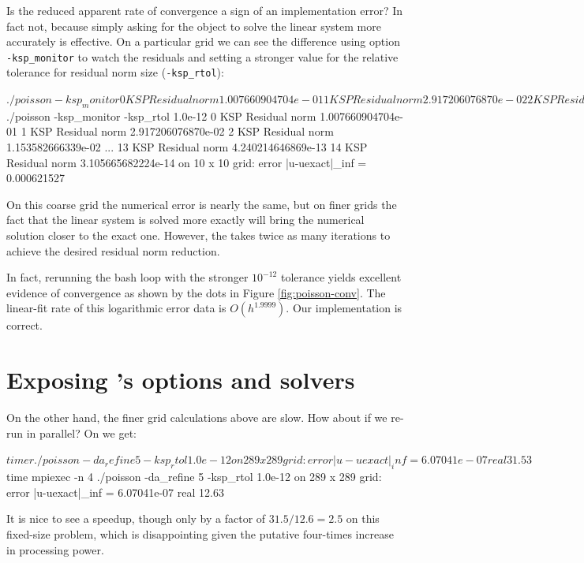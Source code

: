 Is the reduced apparent rate of convergence a sign of an implementation error?  In fact not, because simply asking for the \pKSP object to solve the linear system more accurately is effective.  On a particular grid we can see the difference using option \texttt{-ksp\_monitor} to watch the residuals and setting a stronger value for the \pKSP relative tolerance for residual norm size (\texttt{-ksp\_rtol}):
\begin{cline}
$ ./poisson -ksp_monitor
  0 KSP Residual norm 1.007660904704e-01 
  1 KSP Residual norm 2.917206076870e-02 
  2 KSP Residual norm 1.153582666339e-02 
... 
  6 KSP Residual norm 6.995040432502e-06 
  7 KSP Residual norm 8.593881990968e-07 
on 10 x 10 grid:  error |u-uexact|_inf = 0.000621778
$ ./poisson -ksp_monitor -ksp_rtol 1.0e-12
  0 KSP Residual norm 1.007660904704e-01 
  1 KSP Residual norm 2.917206076870e-02 
  2 KSP Residual norm 1.153582666339e-02 
...
 13 KSP Residual norm 4.240214646869e-13 
 14 KSP Residual norm 3.105665682224e-14 
on 10 x 10 grid:  error |u-uexact|_inf = 0.000621527
\end{cline}
On this coarse grid the numerical error is nearly the same, but on finer grids the fact that the linear system is solved more exactly will bring the numerical solution closer to the exact one.  However, the \pKSP takes twice as many iterations to achieve the desired residual norm reduction.

In fact, rerunning the bash loop with the stronger $10^{-12}$ tolerance yields excellent evidence of convergence as shown by the dots in Figure \ref{fig:poisson-conv}.  The linear-fit rate of this logarithmic error data is $O(h^{1.9999})$.  Our implementation is correct.


\section{Exposing \PETSc's options and solvers}

On the other hand, the finer grid calculations above are slow.  How about if we re-run in parallel?  On \WORKSTATION we get:
\begin{cline}
$ timer ./poisson -da_refine 5 -ksp_rtol 1.0e-12
on 289 x 289 grid:  error |u-uexact|_inf = 6.07041e-07
real 31.53
$ time mpiexec -n 4 ./poisson -da_refine 5 -ksp_rtol 1.0e-12
on 289 x 289 grid:  error |u-uexact|_inf = 6.07041e-07
real 12.63
\end{cline}
It is nice to see a speedup, though only by a factor of $31.5/12.6 = 2.5$ on this fixed-size problem, which is disappointing given the putative four-times increase in processing power.

